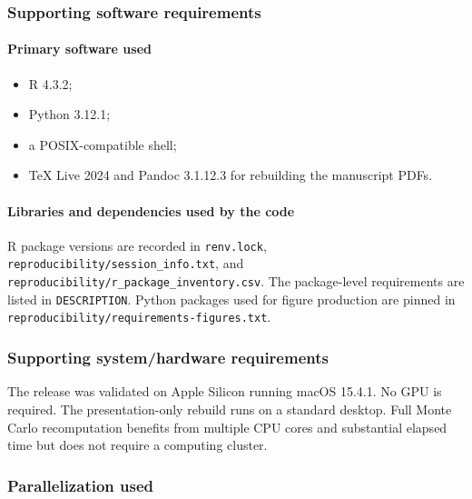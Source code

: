 \documentclass[
  10pt,
]{article}
\providecommand{\tightlist}{%
  \setlength{\itemsep}{0pt}\setlength{\parskip}{0pt}}
\begin{document}
\subsubsection{Supporting software
requirements}\label{supporting-software-requirements}

\paragraph{Primary software used}\label{primary-software-used}

\begin{itemize}
\tightlist
\item
  R 4.3.2;
\item
  Python 3.12.1;
\item
  a POSIX-compatible shell;
\item
  TeX Live 2024 and Pandoc 3.1.12.3 for rebuilding the manuscript PDFs.
\end{itemize}

\paragraph{Libraries and dependencies used by the
code}\label{libraries-and-dependencies-used-by-the-code}

R package versions are recorded in \texttt{renv.lock},
\texttt{reproducibility/session\_info.txt}, and
\texttt{reproducibility/r\_package\_inventory.csv}. The package-level
requirements are listed in \texttt{DESCRIPTION}. Python packages used
for figure production are pinned in
\texttt{reproducibility/requirements-figures.txt}.

\subsubsection{Supporting system/hardware
requirements}\label{supporting-systemhardware-requirements}

The release was validated on Apple Silicon running macOS 15.4.1. No GPU
is required. The presentation-only rebuild runs on a standard desktop.
Full Monte Carlo recomputation benefits from multiple CPU cores and
substantial elapsed time but does not require a computing cluster.

\subsubsection{Parallelization used}\label{parallelization-used}
\end{document}
